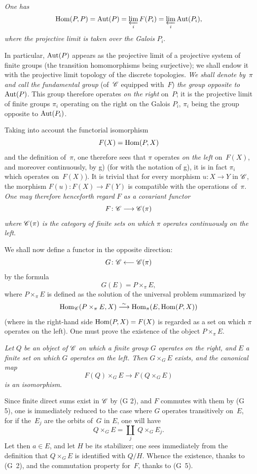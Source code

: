 \begin{enumerateb}
\item[h)] \emph{One has}
$$
\operatorname{Hom}(P,P) = \operatorname{Aut}(P) = \varprojlim_{i} F(P_i) = \varprojlim_{i} \operatorname{Aut}(P_i),
$$
\emph{where the projective limit is taken over the Galois}
$P_i$.

In particular, $\operatorname{Aut}(P)$ appears as the projective limit of a
projective system of finite groups (the transition homomorphisms
being surjective); we shall endow it with the projective limit
topology of the discrete topologies. \emph{We shall denote
by}~$\pi$
\emph{and call the fundamental group}
(of~$\cal{C}$ equipped with~$F$) \emph{the group opposite
to}~$\operatorname{Aut}(P)$. This group therefore operates \emph{on the right}
on~$P$; it is the projective limit of finite groups $\pi_i$
operating on the right on the Galois $P_i$, $\pi_i$ being
the group opposite to $\operatorname{Aut}(P_i)$.

Taking into account the functorial isomorphism
$$
F(X)=\operatorname{Hom}(P,X)
$$
and the definition of~$\pi$, one therefore sees that $\pi$ operates
\emph{on the left} on~$F(X)$, and moreover continuously,
by g) (for with the notation of g), it is in fact $\pi_i$
which operates on~$F(X)$). It is trivial that for every morphism $u
\colon X \to Y$ in $\cal{C}$, the morphism $F(u) \colon F(X) \to
F(Y)$ is compatible with the operations of~$\pi$. \emph{One may
therefore henceforth regard} $F$ \emph{as a covariant
functor}
$$
F \colon \cal{C} \to \cal{C}(\pi)
$$
\emph{where} $\cal{C}(\pi)$ \emph{is the category of finite
sets on which} $\pi$ \emph{operates continuously on the left}.

We shall now define a functor in the opposite direction:
$$
G \colon \cal{C} \from \cal{C}(\pi)
$$
by the formula
$$
G(E)=P \times_{\pi} E,
$$
where $P \times_{\pi} E$ is defined as the solution of the
universal problem summarized by
$$
\Hom_{\cal{C}}(P \times_{\pi} E,X) \isomto \Hom_{\pi}(E,\Hom(P,X))
$$
(where
in the right-hand side $\operatorname{Hom}(P,X)=F(X)$ is regarded
as a set on which $\pi$ operates on the left). One must prove
the existence of the object $P \times_{\pi} E$.

\item[i)] \emph{Let} $Q$ \emph{be an object of} $\cal{C}$ \emph{on which a
finite group} $G$ \emph{operates on the right, and} $E$ \emph{a
finite set on which} $G$ \emph{operates on the left. Then} $G
\times_G E$ \emph{exists, and the canonical map}
$$
F(Q) \times_G E \to F(Q \times_G E)
$$
\emph{is an isomorphism}.

Since finite direct sums exist in $\cal{C}$ by (G 2), and
$F$ commutes with them by (G 5), one is immediately reduced to the case
where $G$ operates transitively on~$E$, for if the~$E_j$ are the
orbits of~$G$ in $E$, one will have
$$
Q \times_G E = \underset {j}{\amalg}\ Q \times_G E_j.
$$
Let then $a \in E$, and let $H$ be its stabilizer; one sees immediately
from the definition that $Q \times_G E$ is identified with $Q/H$.
Whence the existence, thanks to (G~2), and the commutation property
for~$F$, thanks to (G~5).


\end{enumerateb}
